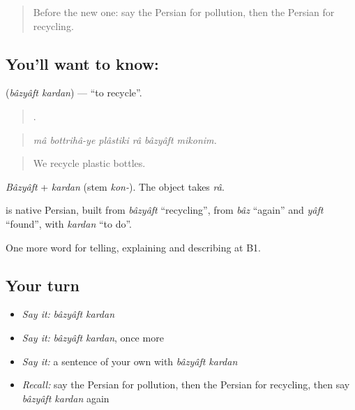 \label{lesson:FA-C388-bazyaft-kardan}



\begin{quote}
Before the new one: say the Persian for pollution, then the Persian for recycling.
\end{quote}

\subsection*{You'll want to know:  }
\textbf{ } (\emph{bâzyâft kardan}) — \textquotedblleft{}to recycle\textquotedblright{}.

\begin{quote}
     .
\end{quote}

\begin{quote}
\emph{mâ bottrihâ-ye plâstiki râ bâzyâft mikonim.}
\end{quote}

\begin{quote}
We recycle plastic bottles.
\end{quote}

\emph{Bâzyâft} + \emph{kardan} (stem \emph{kon-}). The object takes \emph{râ}.

\begin{cousinweb}
\textbf{ } is native Persian, built from \emph{bâzyâft} \textquotedblleft{}recycling\textquotedblright{}, from \emph{bâz} \textquotedblleft{}again\textquotedblright{} and \emph{yâft} \textquotedblleft{}found\textquotedblright{}, with \emph{kardan} \textquotedblleft{}to do\textquotedblright{}.
\end{cousinweb}

\begin{grammarlens}[title={What you've built}]
One more word for telling, explaining and describing at B1.
\end{grammarlens}

\subsection*{Your turn}
\begin{itemize}
\raggedright
  \item \emph{Say it:} \emph{bâzyâft kardan}
  \item \emph{Say it:} \emph{bâzyâft kardan}, once more
  \item \emph{Say it:} a sentence of your own with \emph{bâzyâft kardan}
  \item \emph{Recall:} say the Persian for pollution, then the Persian for recycling, then say \emph{bâzyâft kardan} again
\end{itemize}

